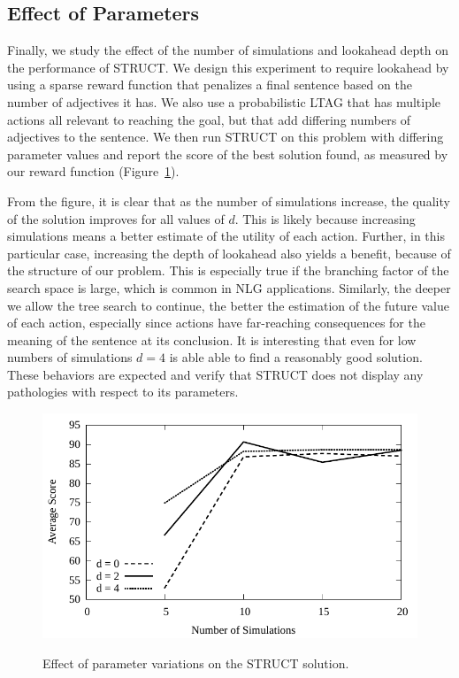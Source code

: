 \subsection{Effect of Parameters}

Finally, we study the effect of the number of simulations and
lookahead depth on the performance of STRUCT. We design this
experiment to require lookahead by using a sparse
reward function that penalizes a final sentence based on the number of
adjectives it has. We also use a probabilistic LTAG that has multiple
actions all relevant to reaching the goal, but that add differing
numbers of adjectives to the sentence. We then run STRUCT on this
problem with differing parameter values and report the score of the
best solution found, as measured by our reward function
(Figure~\ref{chart-n-v-score}). 

From the figure, it is clear that as the number of simulations
increase, the quality of the solution improves for all values of $d$.
This is likely because increasing simulations means a better estimate
of the utility of each action. Further, in this particular case,
increasing the depth of lookahead also yields a benefit, because of
the structure of our problem. This is especially true if the branching
factor of the search space is large, which is common in NLG
applications.  Similarly, the deeper we allow the tree search to continue, the
better the estimation of the future value of each action,
especially since actions have far-reaching consequences for the
meaning of the sentence at its conclusion. 
It is interesting that even for low numbers of
simulations $d=4$ is able able to find a reasonably good
solution. These behaviors are expected and verify 
that STRUCT does not display any pathologies with respect to its parameters.

\begin{figure}
\centering
\includegraphics[width=0.7 \linewidth]{../analysis/plots/params/pltag-n-v-score.pdf}
\label{chart-n-v-score}
\caption{Effect of parameter variations on the STRUCT solution.}
\end{figure}

